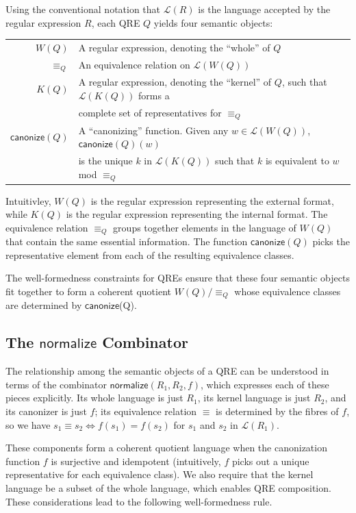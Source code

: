\documentclass[acmsmall,review,anonymous]{acmart}
\newcommand{\codefont}[1]{\ensuremath{\mathsf{#1}}}
\newcommand{\kw}[1]{\codefont{#1}}
\newcommand{\normalize}[3]{\ensuremath{\kw{normalize}(#1, #2, #3)}}
\newcommand{\eqrel}[1]{\ensuremath{\equiv_{#1}}}
\newcommand{\canonize}{\ensuremath{\kw{canonize}}}
\begin{document}
Using the conventional notation that $\mathcal{L}(R)$ is the language accepted
by the regular expression $R$, each QRE $Q$ yields four semantic
objects:

\begin{tabular}{rl}
  $W(Q)$       & A regular expression, denoting the ``whole'' of $Q$\\
  $\eqrel{Q}$  & An equivalence relation on $\mathcal{L}(W(Q))$\\
  $K(Q)$       & A regular expression, denoting the ``kernel'' of $Q$, such that
                  $\mathcal{L}(K(Q))$ forms a \\
               & complete set of representatives for $\eqrel{Q}$ \\
  $\canonize(Q)$ & 
  A ``canonizing'' function. Given any $w \in \mathcal{L}(W(Q))$,
  $\canonize(Q)(w)$ \\ & is the unique $k$ in $\mathcal{L}(K(Q))$ such
  that $k$ is equivalent to $w$ mod $\eqrel{Q}$
\end{tabular}

\noindent
Intuitivley, $W(Q)$ is the regular expression representing the
external format, while $K(Q)$ is the regular expression representing
the internal format.  The equivalence relation $\eqrel{Q}$ groups
together elements in the language of $W(Q)$ that contain the same
essential information.  The function $\canonize(Q)$ picks the
representative element from each of the resulting equivalence classes.

The well-formedness constraints for QREs ensure that these four semantic
objects fit together to form a coherent quotient $W(Q)/\eqrel{Q}$ whose
equivalence classes are determined by \canonize(Q).

\subsection{The \kw{normalize} Combinator}

The relationship among the semantic objects of a QRE can be understood in terms
of the combinator \normalize{R_1}{R_2}{f}, which expresses each of these pieces
explicitly.  Its whole language is just $R_1$, its kernel language is just
$R_2$, and its canonizer is just $f$; 
its equivalence relation $\equiv$ is
determined by the fibres of $f$, so we have
$s_1 \equiv s_2 \Leftrightarrow f(s_1) = f(s_2)$ for $s_1$ and $s_2$
in $\mathcal{L}(R_1)$.

These components form a coherent quotient language when the canonization
function $f$ is surjective and idempotent (intuitively, $f$ picks out a unique
representative for each equivalence class).  We also require that the kernel
language be a subset of the whole language, which enables QRE composition.
These considerations lead to the following well-formedness rule.
\end{document}

